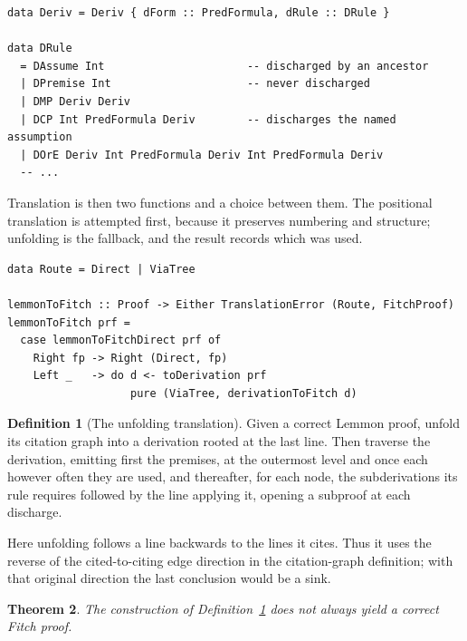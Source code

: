 \documentclass[11pt]{article}
\theoremstyle{plain}
\newtheorem{theorem}{Theorem}
\theoremstyle{definition}
\newtheorem{definition}[theorem]{Definition}
\theoremstyle{remark}
\begin{document}
\begin{lstlisting}
data Deriv = Deriv { dForm :: PredFormula, dRule :: DRule }

data DRule
  = DAssume Int                      -- discharged by an ancestor
  | DPremise Int                     -- never discharged
  | DMP Deriv Deriv
  | DCP Int PredFormula Deriv        -- discharges the named assumption
  | DOrE Deriv Int PredFormula Deriv Int PredFormula Deriv
  -- ...
\end{lstlisting}

Translation is then two functions and a choice between them. The positional
translation is attempted first, because it preserves numbering and structure;
unfolding is the fallback, and the result records which was used.

\begin{lstlisting}
data Route = Direct | ViaTree

lemmonToFitch :: Proof -> Either TranslationError (Route, FitchProof)
lemmonToFitch prf =
  case lemmonToFitchDirect prf of
    Right fp -> Right (Direct, fp)
    Left _   -> do d <- toDerivation prf
                   pure (ViaTree, derivationToFitch d)
\end{lstlisting}

\begin{definition}[The unfolding translation]\label{def:construction}
Given a correct Lemmon proof, unfold its citation graph into a derivation
rooted at the last line. Then traverse the derivation, emitting first the
premises, at the outermost level and once each however often they are used,
and thereafter, for each node, the subderivations its rule requires followed
by the line applying it, opening a subproof at each discharge.
\end{definition}

Here unfolding follows a line backwards to the lines it cites. Thus it uses
the reverse of the cited-to-citing edge direction in the citation-graph
definition; with that original direction the last conclusion would be a sink.

\begin{theorem}\label{thm:refuted}
The construction of Definition~\ref{def:construction} does not always yield a
correct Fitch proof.
\end{theorem}
\end{document}

